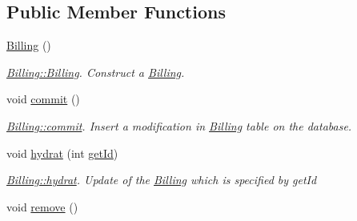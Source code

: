 \subsection*{Public Member Functions}
\begin{DoxyCompactItemize}
\item 
\hypertarget{classBilling_a8e7a38f9ef550c20ce1bf6b46153defa}{\hyperlink{classBilling_a8e7a38f9ef550c20ce1bf6b46153defa}{Billing} ()}\label{classBilling_a8e7a38f9ef550c20ce1bf6b46153defa}

\begin{DoxyCompactList}\small\item\em \hyperlink{classBilling_a8e7a38f9ef550c20ce1bf6b46153defa}{Billing\+::\+Billing}. Construct a \hyperlink{classBilling}{Billing}. \end{DoxyCompactList}\item 
\hypertarget{classBilling_a3d96a6baed6ca2d2e1096496f0fd3270}{void \hyperlink{classBilling_a3d96a6baed6ca2d2e1096496f0fd3270}{commit} ()}\label{classBilling_a3d96a6baed6ca2d2e1096496f0fd3270}

\begin{DoxyCompactList}\small\item\em \hyperlink{classBilling_a3d96a6baed6ca2d2e1096496f0fd3270}{Billing\+::commit}. Insert a modification in \hyperlink{classBilling}{Billing} table on the database. \end{DoxyCompactList}\item 
void \hyperlink{classBilling_a8beb72061cd53a964cf0ba3f04686613}{hydrat} (int \hyperlink{classIDatabaseModel_a61523b015ec148d4e68ee8054c2ad3e3}{get\+Id})
\begin{DoxyCompactList}\small\item\em \hyperlink{classBilling_a8beb72061cd53a964cf0ba3f04686613}{Billing\+::hydrat}. Update of the \hyperlink{classBilling}{Billing} which is specified by {\itshape get\+Id} \end{DoxyCompactList}\item 
\hypertarget{classBilling_ab5efe0286d292707073b9f1cecd98d6f}{void \hyperlink{classBilling_ab5efe0286d292707073b9f1cecd98d6f}{remove} ()}\label{classBilling_ab5efe0286d292707073b9f1cecd98d6f}


\end{DoxyCompactItemize}
